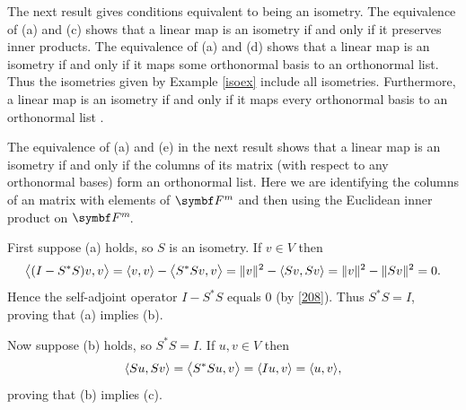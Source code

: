 The next result gives conditions equivalent to being an isometry.  The equivalence of (a) and (c) shows that a linear map is an isometry if and only if it preserves inner products. The equivalence of (a) and (d) shows that a linear map is an isometry if and only if it maps some orthonormal basis to an orthonormal list. Thus the isometries given by Example \ref{isoex} include all isometries. Furthermore, a linear map is an isometry if and only if it maps every orthonormal basis to an orthonormal list .

\pagebreak[3]

The equivalence of (a) and (e) in the next result shows that a linear map is an isometry if and only if the columns of its matrix (with respect to any orthonormal bases) form an orthonormal list. Here we are identifying the columns of an  matrix with elements of $\F{m}$ and then using the Euclidean inner product on $\FF{m}$.


\proof
First suppose (a) holds, so $S$ is an isometry. If $v \in V$ then
\[
\ip[\big]{ (I - S^*S)v, v } = \ip{ v, v } - \ip[\big]{S^*Sv, v} = \norm{v}^2 - \ip{Sv, Sv} = \norm{v}^2 - \norm{Sv}^2 = 0.
\]
Hence the self-adjoint operator $I - S^*S$ equals $0$ (by \ref{208}). Thus $S^*S = I$, proving that (a) implies (b).

Now suppose (b) holds, so $S^*S = I$. If $u, v \in V$ then
\[
\ip{Su, Sv} = \ip[\big]{S^*Su, v} = \ip{Iu, v} = \ip{u, v},
\]
proving that (b) implies (c).


